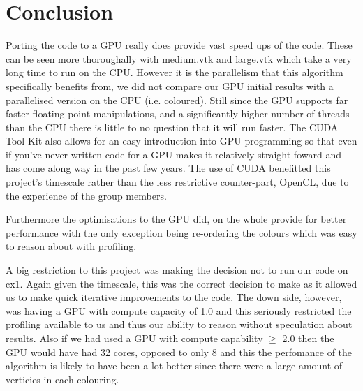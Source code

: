 \section*{Conclusion}
Porting the code to a GPU really does provide vast speed ups of the code. These can be seen more thoroughally with medium.vtk and large.vtk which take a very long time to run on the CPU.
However it is the parallelism that this algorithm specifically benefits from, we did not compare our GPU initial results with a parallelised version on the CPU (i.e. coloured). Still since the GPU supports far faster floating point manipulations, and a significantly higher number of threads than the CPU there is little to no question that it will run faster.
The CUDA Tool Kit also allows for an easy introduction into GPU programming so that even if you've never written code for a GPU makes it relatively straight foward and has come along way in the past few years. The use of CUDA benefitted this project's timescale rather than the less restrictive counter-part, OpenCL, due to the experience of the group members.

Furthermore the optimisations to the GPU did, on the whole provide for better performance with the only exception being re-ordering the colours which was easy to reason about with profiling.

A big restriction to this project was making the decision not to run our code on cx1. Again given the timescale, this was the correct decision to make as it allowed us to make quick iterative improvements to the code. The down side, however, was having a GPU with compute capacity of 1.0 and this seriously restricted the profiling available to us and thus our ability to reason without speculation about results.
Also if we had used a GPU with compute capability $\ge$ 2.0 then the GPU would have had 32 cores\cite{compute_2.0}, opposed to only 8 and this the perfomance of the algorithm is likely to have been a lot better since there were a large amount of verticies in each colouring.